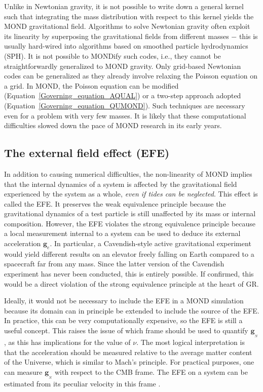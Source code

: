 \documentclass[fleqn,usenatbib,useAMS,onecolumn]{mnras} %
\begin{document}
Unlike in Newtonian gravity, it is not possible to write down a general kernel such that integrating the mass distribution with respect to this kernel yields the MOND gravitational field. Algorithms to solve Newtonian gravity often exploit its linearity by superposing the gravitational fields from different masses $-$ this is usually hard-wired into algorithms based on smoothed particle hydrodynamics (SPH). It is not possible to MONDify such codes, i.e., they cannot be straightforwardly generalized to MOND gravity. Only grid-based Newtonian codes can be generalized as they already involve relaxing the Poisson equation on a grid. In MOND, the Poisson equation can be modified (Equation~\ref{Governing_equation_AQUAL}) or a two-step approach adopted (Equation~\ref{Governing_equation_QUMOND}). Such techniques are necessary even for a problem with very few masses. It is likely that these computational difficulties slowed down the pace of MOND research in its early years.



\subsection{The external field effect (EFE)}
\label{EFE_theory}

In addition to causing numerical difficulties, the non-linearity of MOND implies that the internal dynamics of a system is affected by the gravitational field experienced by the system as a whole, \emph{even if tides can be neglected}. This effect is called the EFE. It preserves the weak equivalence principle because the gravitational dynamics of a test particle is still unaffected by its mass or internal composition. However, the EFE violates the strong equivalence principle because a local measurement internal to a system can be used to deduce its external acceleration $\bm{g}_e$. In particular, a Cavendish-style active gravitational experiment would yield different results on an elevator freely falling on Earth compared to a spacecraft far from any mass. Since the latter version of the Cavendish experiment has never been conducted, this is entirely possible. If confirmed, this would be a direct violation of the strong equivalence principle at the heart of GR.

Ideally, it would not be necessary to include the EFE in a MOND simulation because its domain can in principle be extended to include the source of the EFE. In practice, this can be very computationally expensive, so the EFE is still a useful concept. This raises the issue of which frame should be used to quantify $\bm{g}_{_N}$, as this has implications for the value of $\nu$. The most logical interpretation is that the acceleration should be measured relative to the average matter content of the Universe, which is similar to Mach's principle. For practical purposes, one can measure $\bm{g}_{_N}$ with respect to the CMB frame. The EFE on a system can be estimated from its peculiar velocity in this frame \citep{Famaey_2007, Banik_Ryan_2018}.
\end{document}
